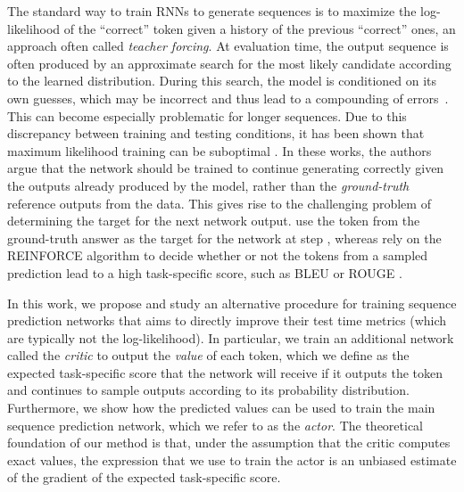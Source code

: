 \documentclass{article} \usepackage{iclr2017_conference,times}
\begin{document}
The standard way to train RNNs to generate sequences is to
maximize the log-likelihood of the ``correct'' token given a history of the
previous ``correct'' ones, an approach often called \textit{teacher forcing}.
At evaluation time, the output sequence is often produced by an approximate search for 
the most likely candidate according to the learned distribution. During this search,
the model is conditioned on its own guesses, which may be incorrect and thus lead to a compounding of errors~\citep{bengio2015scheduled}.
This can become especially problematic for longer sequences.
Due to this discrepancy between training and testing conditions, it has been shown that maximum likelihood training can be suboptimal \citep{bengio2015scheduled,ranzato2015sequence}. 
In these works, the authors argue that the network should be trained to continue
generating correctly given the outputs already produced by the model, rather
than the \emph{ground-truth} reference outputs from the data. This gives rise to the challenging problem of
determining the target for the next network output.
\citet{bengio2015scheduled} use the
token  from the ground-truth answer as the target for the network at step
, whereas \citet{ranzato2015sequence} rely on the REINFORCE
algorithm \citep{williams1992simple} to decide whether or not the tokens from a
sampled prediction lead to a high task-specific score, such as BLEU 
\citep{papineni2002bleu} or ROUGE \citep{lin2003automatic}.

In this work, we propose and study an alternative procedure for training
sequence prediction networks that aims to directly improve their test time
metrics (which are typically not the log-likelihood).
In particular, we train an additional network called 
the \textit{critic} to output the \textit{value} of each
token, which we define as the expected task-specific score that the network
will receive if it outputs the token and continues to sample outputs according to
its probability distribution. Furthermore, we show how the predicted values can be used
to train the main sequence prediction network, which we refer to as the \textit{actor}.
The theoretical foundation of our method is that, under the assumption that the
critic computes exact values, the expression that we use to train the actor is an unbiased
estimate of the gradient of the expected task-specific score. 
\end{document}
